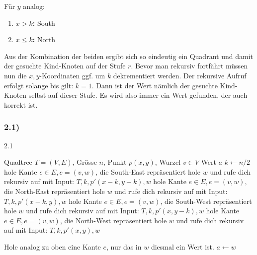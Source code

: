 \documentclass[a4paper, fontsize=10pt]{scrartcl}
\begin{document}
Für $y$ analog:
\begin{enumerate}
\item \textbf{$x>k$:} South
\item \textbf{$x\leq k$:} North
\end{enumerate}

Aus der Kombination der beiden ergibt sich so eindeutig ein Quadrant und damit der gesuchte Kind-Knoten auf der Stufe $r$. Bevor man rekursiv fortfährt müssen nun die $x,y$-Koordinaten ggf. um $k$ dekrementiert werden. Der rekursive Aufruf erfolgt solange bis gilt: $k=1$. Dann ist der Wert nämlich der gesuchte Kind-Knoten selbst auf dieser Stufe. Es wird also immer ein Wert gefunden, der auch korrekt ist.

\subsubsection*{2.1)}

\begin{algorithm}[H]
  \caption{2.1}
    \begin{algorithmic}
        \REQUIRE Quadtree $T=(V,E)$, Grösse $n$, Punkt $p(x,y)$, Wurzel $v\in V$
        \ENSURE Wert $a$
        \STATE $k \leftarrow n/2$
                      \STATE hole Kante $e\in E,e=(v,w)$, die South-East repräsentiert
                      \STATE hole $w$ und rufe dich rekursiv auf mit Input: $T, k, p'(x-k,y-k),w$
                    \ELSE
                      \STATE hole Kante $e\in E,e=(v,w)$, die North-East repräsentiert
                      \STATE hole $w$ und rufe dich rekursiv auf mit Input: $T, k, p'(x-k,y),w$       
                    \ENDIF
                \ELSE
                      \STATE hole Kante $e\in E,e=(v,w)$, die South-West repräsentiert
                      \STATE hole $w$ und rufe dich rekursiv auf mit Input: $T, k, p'(x,y-k),w$
                    \ELSE
                      \STATE hole Kante $e\in E,e=(v,w)$, die North-West repräsentiert
                      \STATE hole $w$ und rufe dich rekursiv auf mit Input: $T, k, p'(x,y),w$
                    \ENDIF
                \ENDIF
          
          \ENDWHILE
    \STATE Hole analog zu oben eine Kante $e$, nur das in $w$ diesmal ein Wert ist.
    \STATE $a \leftarrow w$
    \end{algorithmic}
\end{algorithm}
\end{document}

